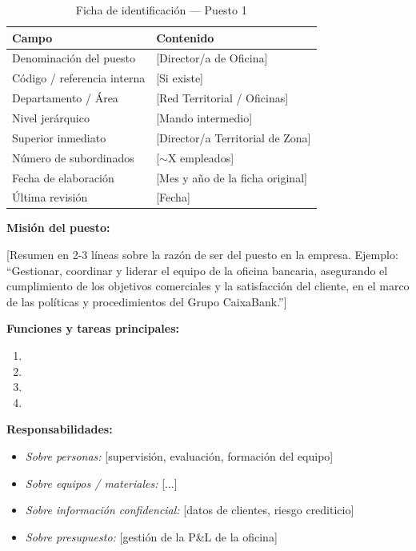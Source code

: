 \begin{table}[H]
  \centering
  \small
  \caption{Ficha de identificación — Puesto 1}
  \begin{tabularx}{\textwidth}{lX}
    \toprule
    \textbf{Campo}               & \textbf{Contenido} \\
    \midrule
    Denominación del puesto      & [Director/a de Oficina] \\
    Código / referencia interna  & [Si existe] \\
    Departamento / Área          & [Red Territorial / Oficinas] \\
    Nivel jerárquico             & [Mando intermedio] \\
    Superior inmediato           & [Director/a Territorial de Zona] \\
    Número de subordinados       & [$\sim$X empleados] \\
    Fecha de elaboración         & [Mes y año de la ficha original] \\
    Última revisión              & [Fecha] \\
    \bottomrule
  \end{tabularx}
\end{table}

\textbf{Misión del puesto:}

[Resumen en 2-3 líneas sobre la razón de ser del puesto en la empresa.
Ejemplo: ``Gestionar, coordinar y liderar el equipo de la oficina bancaria,
asegurando el cumplimiento de los objetivos comerciales y la satisfacción
del cliente, en el marco de las políticas y procedimientos del Grupo CaixaBank.'']

\textbf{Funciones y tareas principales:}
\begin{enumerate}
  \item [Tarea 1 — descripción breve]
  \item [Tarea 2]
  \item [Tarea 3]
  \item [...]
\end{enumerate}

\textbf{Responsabilidades:}
\begin{itemize}
  \item \textit{Sobre personas:} [supervisión, evaluación, formación del equipo]
  \item \textit{Sobre equipos / materiales:} [...]
  \item \textit{Sobre información confidencial:} [datos de clientes, riesgo crediticio]
  \item \textit{Sobre presupuesto:} [gestión de la P\&L de la oficina]
\end{itemize}

